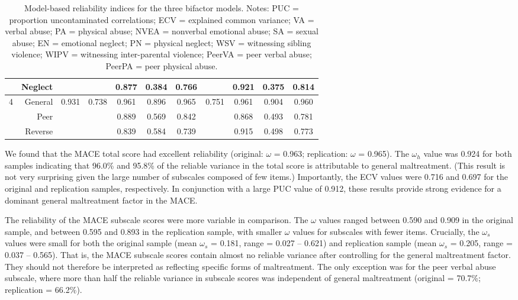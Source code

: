 \documentclass[letterpaper,man,natbib,floatsintext,longtable]{apa6}
\begin{document}
\begin{table}[h!]
\begin{tabular*}{\textwidth}{crccccccccc}
& Neglect   &        &       &  0.877 &   0.384 &  0.766 &       & 0.921 & 0.375 & 0.814 \\
\midrule
4 & General &  0.931 & 0.738 &  0.961 &   0.896 &  0.965 & 0.751 & 0.961 & 0.904 & 0.960 \\
& Peer      &        &       &  0.889 &   0.569 &  0.842 &       & 0.868 & 0.493 & 0.781 \\
& Reverse   &        &       &  0.839 &   0.584 &  0.739 &       & 0.915 & 0.498 & 0.773 \\
\bottomrule
\end{tabular*}
\captionsetup{width=1.\textwidth}
\caption{\normalfont Model-based reliability indices for the three bifactor models. Notes: PUC = proportion uncontaminated correlations; ECV = explained common variance; VA = verbal abuse; PA = physical abuse; NVEA = nonverbal emotional abuse; SA = sexual abuse; EN = emotional neglect; PN = physical neglect; WSV = witnessing sibling violence; WIPV = witnessing inter-parental violence; PeerVA = peer verbal abuse; PeerPA = peer physical abuse.}
\label{table:reliability}
\end{table}

We found that the MACE total score had excellent reliability (original: $\omega$ = 0.963; replication: $\omega$ = 0.965). The $\omega_h$ value was 0.924 for both samples indicating that 96.0\% and 95.8\% of the reliable variance in the total score is attributable to general maltreatment. (This result is not very surprising given the large number of subscales composed of few items.) Importantly, the ECV values were 0.716 and 0.697 for the original and replication samples, respectively. In conjunction with a large PUC value of 0.912, these results provide strong evidence for a dominant general maltreatment factor in the MACE. 

The reliability of the MACE subscale scores were more variable in comparison. The $\omega$ values ranged between 0.590 and 0.909 in the original sample, and between 0.595 and 0.893 in the replication sample, with smaller $\omega$ values for subscales with fewer items. Crucially, the $\omega_s$ values were small for both the original sample (mean $\omega_s$ = 0.181, range = 0.027 -- 0.621) and replication sample (mean $\omega_s$ = 0.205, range = 0.037 -- 0.565). That is, the MACE subscale scores contain almost no reliable variance after controlling for the general maltreatment factor. They should not therefore be interpreted as reflecting specific forms of maltreatment. The only exception was for the peer verbal abuse subscale, where more than half the reliable variance in subscale scores was independent of general maltreatment (original = 70.7\%; replication = 66.2\%).
\end{document}
